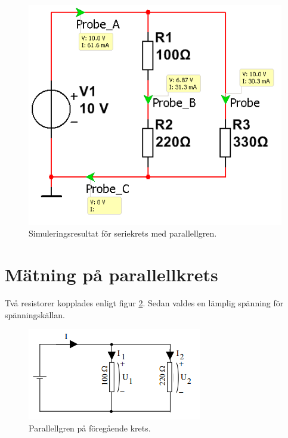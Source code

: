 \documentclass[11pt,a4paper]{article}
\begin{document}
\begin{figure}[htbp]
    \centering
    \includegraphics[scale=0.5]{ee466multisim/2.png}
    \caption{Simuleringsresultat för seriekrets med parallellgren.}
    \label{fig:sim-para}
\end{figure}

\clearpage

\section{Mätning på parallellkrets}\label{}
Två resistorer kopplades enligt figur \ref{fig:3-mm-schem}.
Sedan valdes en lämplig spänning för spänningskällan.

\begin{figure}[htbp]
    \centering
        \includegraphics[scale=1]{misc/krets3.png}
    \caption{Parallellgren på föregående krets.}
    \label{fig:3-mm-schem}
\end{figure}
\end{document}
